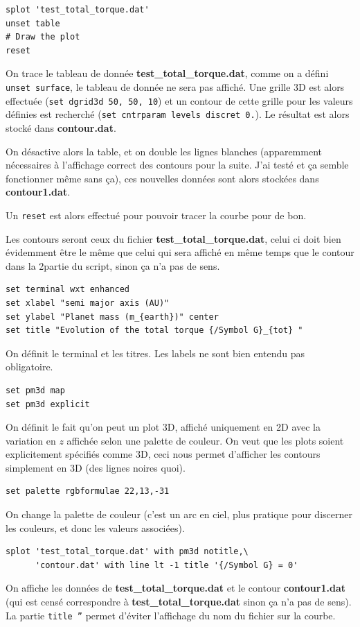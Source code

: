 \documentclass[a4paper,twoside]{article}
\begin{document}
\begin{verbatim}
splot 'test_total_torque.dat'
unset table
# Draw the plot
reset
\end{verbatim}
On trace le tableau de donnée \textbf{test\_total\_torque.dat}, comme on a défini \texttt{unset surface}, le tableau de donnée ne sera pas affiché. Une grille 3D est alors effectuée (\texttt{set dgrid3d 50, 50, 10}) et un contour de cette grille pour les valeurs définies est recherché (\texttt{set cntrparam levels discret 0.}). Le résultat est alors stocké dans \textbf{contour.dat}.

On désactive alors la table, et on double les lignes blanches (apparemment nécessaires à l'affichage correct des contours pour la suite. J'ai testé et ça semble fonctionner même sans ça), ces nouvelles données sont alors stockées dans \textbf{contour1.dat}.

Un \texttt{reset} est alors effectué pour pouvoir tracer la courbe pour de bon. 

\begin{attention}
Les contours seront ceux du fichier \textbf{test\_total\_torque.dat}, celui ci doit bien évidemment être le même que celui qui sera affiché en même temps que le contour dans la 2\ieme partie du script, sinon ça n'a pas de sens. 
\end{attention}


\begin{verbatim}
set terminal wxt enhanced
set xlabel "semi major axis (AU)"
set ylabel "Planet mass (m_{earth})" center
set title "Evolution of the total torque {/Symbol G}_{tot} "
\end{verbatim}
On définit le terminal et les titres. Les labels ne sont bien entendu pas obligatoire.

\begin{verbatim}
set pm3d map
set pm3d explicit
\end{verbatim}
On définit le fait qu'on peut un plot 3D, affiché uniquement en 2D avec la variation en $z$ affichée selon une palette de couleur. On veut que les plots soient explicitement spécifiés comme 3D, ceci nous permet d'afficher les contours simplement en 3D (des lignes noires quoi). 

\begin{verbatim}
set palette rgbformulae 22,13,-31
\end{verbatim}
On change la palette de couleur (c'est un arc en ciel, plus pratique pour discerner les couleurs, et donc les valeurs associées).

\begin{verbatim}
splot 'test_total_torque.dat' with pm3d notitle,\
      'contour.dat' with line lt -1 title '{/Symbol G} = 0'
\end{verbatim}
On affiche les données de \textbf{test\_total\_torque.dat} et le contour \textbf{contour1.dat} (qui est censé correspondre à \textbf{test\_total\_torque.dat} sinon ça n'a pas de sens). La partie \texttt{title ''} permet d'éviter l'affichage du nom du fichier sur la courbe.
\end{document}
